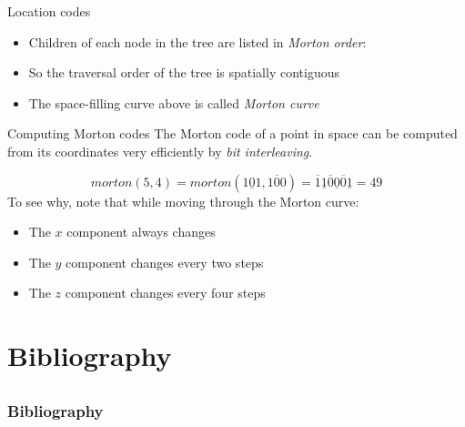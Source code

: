 \documentclass[utf8x]{beamer}
\begin{document}
\begin{frame}{Location codes}
\begin{itemize}
\item Children of each node in the tree are listed in \emph{Morton order}:
\end{itemize}
\begin{center}
\end{center}
\begin{itemize}
\item So the traversal order of the tree is spatially contiguous 
\item The space-filling curve above is called \emph{Morton curve} 
      \cite{Morton66}
\end{itemize}
\end{frame}

\begin{frame}{Computing Morton codes}
The Morton code of a point in space can be computed from its coordinates very
efficiently by \emph{bit interleaving}.

\begin{equation}
morton(5,4) = morton(\underline{101}, \overline{100}) = 
\overline{1}
\underline{1}
\overline{0}
\underline{0}
\overline{0}
\underline{1} = 49
\end{equation}
To see why, note that while moving through the Morton curve:
\begin{itemize}
\item The $x$ component always changes
\item The $y$ component changes every two steps
\item The $z$ component changes every four steps
\end{itemize} 
\end{frame}

\section{Bibliography}
\subsection{}
\begin{frame}[allowframebreaks]
\frametitle{Bibliography}
\begin{center}


\end{center}
\end{frame}
\end{document}
